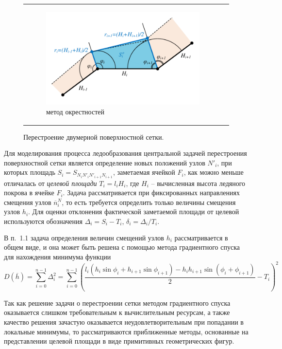 \documentclass[a4paper,14pt]{extarticle}                     %
\theoremstyle{plain}                                         %
\begin{document}
\begin{figure}[ht]
\begin{tabular}{ll}
\begin{subfigure}{0.45\textwidth}\centering\includegraphics[width=0.75\columnwidth]{pics/text_1_remesh_2d/remesh_okrestnost.pdf}\caption{метод окрестностей}\end{subfigure}
\end{tabular}
\singlespacing
\caption{Перестроение двумерной поверхностной сетки.}
\label{fig:remesh_2d}
\end{figure}

Для моделирования процесса ледообразования центральной задачей перестроения поверхностной сетки является определение новых положений узлов $N'_i$, при которых площадь $S_i = S_{N_iN'_iN'_{i+1}N_{i+1}}$, заметаемая ячейкой $F_i$, как можно меньше отличалась от \textit{целевой площади} $T_i = l_i H_i$, где $H_i$ -- вычисленная высота ледяного покрова в ячейке $F_i$.
Задача рассматривается при фиксированных направлениях смещения узлов $\overline{n}_i^N$, то есть требуется определить только величины смещения узлов $h_i$.
Для оценки отклонения фактической заметаемой площади от целевой используются обозначения $\Delta_i = S_i - T_i$, $\delta_i = \Delta_i / T_i$.


В п.~1.1 задача определения величин смещений узлов $h_i$ рассматривается в общем виде, и она может быть решена с помощью метода градиентного спуска для нахождения минимума функции
\begin{equation*}
	D(\overline{h}) = \sum_{i = 0}^{n - 1}{\Delta_i^2} = \sum_{i = 0}^{n - 1}{ \left( \frac{ l_i(h_i \sin \phi_i + h_{i + 1} \sin \phi_{i+1}) - h_ih_{i + 1} \sin(\phi_i + \phi_{i+1}) }{2} - T_i \right)^2}
\end{equation*}

Так как решение задачи о перестроении сетки методом градиентного спуска оказывается слишком требовательным к вычислительным ресурсам, а также качество решения зачастую оказывается неудовлетворительным при попадании в локальные минимумы, то рассматриваются приближенные методы, основанные на представлении целевой площади в виде примитивных геометрических фигур.
\end{document}
